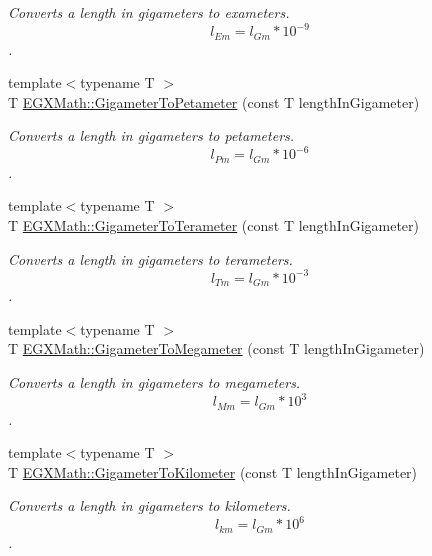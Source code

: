 \begin{DoxyCompactItemize}
\begin{DoxyCompactList}\small\item\em Converts a length in gigameters to exameters. \[ l_{Em}=l_{Gm} * 10^{-9} \]. \end{DoxyCompactList}\item 
{\footnotesize template$<$typename T $>$ }\\T \mbox{\hyperlink{group___e_g_x_math-_conversions-_length_conversions-_gigameter-_s_i_gae0dceabe14b5e84394285441be46bb8d}{E\+G\+X\+Math\+::\+Gigameter\+To\+Petameter}} (const T length\+In\+Gigameter)
\begin{DoxyCompactList}\small\item\em Converts a length in gigameters to petameters. \[ l_{Pm}=l_{Gm} * 10^{-6} \]. \end{DoxyCompactList}\item 
{\footnotesize template$<$typename T $>$ }\\T \mbox{\hyperlink{group___e_g_x_math-_conversions-_length_conversions-_gigameter-_s_i_ga7cab1971a673d663a4eadd070afedf7e}{E\+G\+X\+Math\+::\+Gigameter\+To\+Terameter}} (const T length\+In\+Gigameter)
\begin{DoxyCompactList}\small\item\em Converts a length in gigameters to terameters. \[ l_{Tm}=l_{Gm} * 10^{-3} \]. \end{DoxyCompactList}\item 
{\footnotesize template$<$typename T $>$ }\\T \mbox{\hyperlink{group___e_g_x_math-_conversions-_length_conversions-_gigameter-_s_i_ga13984c61b3aaa41953de2415c6981f37}{E\+G\+X\+Math\+::\+Gigameter\+To\+Megameter}} (const T length\+In\+Gigameter)
\begin{DoxyCompactList}\small\item\em Converts a length in gigameters to megameters. \[ l_{Mm}=l_{Gm} * 10^{3} \]. \end{DoxyCompactList}\item 
{\footnotesize template$<$typename T $>$ }\\T \mbox{\hyperlink{group___e_g_x_math-_conversions-_length_conversions-_gigameter-_s_i_ga6f5a65da868d2c40485588dff765836e}{E\+G\+X\+Math\+::\+Gigameter\+To\+Kilometer}} (const T length\+In\+Gigameter)
\begin{DoxyCompactList}\small\item\em Converts a length in gigameters to kilometers. \[ l_{km}=l_{Gm} * 10^{6} \]. \end{DoxyCompactList}\item 

\end{DoxyCompactItemize}
